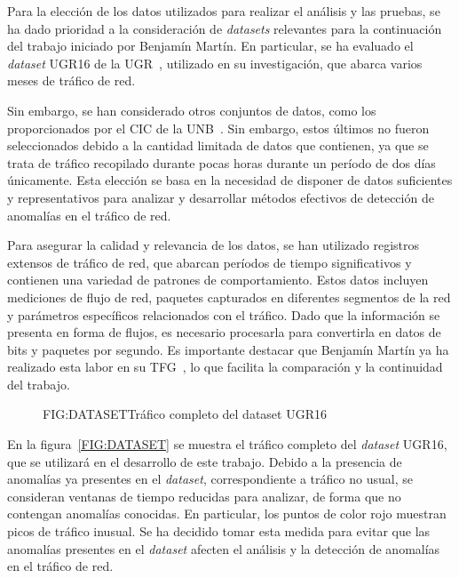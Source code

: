 Para la elección de los datos utilizados para realizar el análisis y las pruebas, se ha dado prioridad a la consideración de \textit{datasets} relevantes para la continuación del trabajo iniciado por Benjamín Martín. En particular, se ha evaluado el \textit{dataset} UGR16 de la  \ac{UGR}~\cite{datosugr16}, utilizado en su investigación, que abarca varios meses de tráfico de red. 

Sin embargo, se han considerado otros conjuntos de datos, como los proporcionados por el \ac{CIC} de la \ac{UNB}~\cite{datosunb19}. Sin embargo, estos últimos no fueron seleccionados debido a la cantidad limitada de datos que contienen, ya que se trata de tráfico recopilado durante pocas horas durante un período de dos días únicamente. Esta elección se basa en la necesidad de disponer de datos suficientes y representativos para analizar y desarrollar métodos efectivos de detección de anomalías en el tráfico de red.

Para asegurar la calidad y relevancia de los datos, se han utilizado registros extensos de tráfico de red, que abarcan períodos de tiempo significativos y contienen una variedad de patrones de comportamiento. Estos datos incluyen mediciones de flujo de red, paquetes capturados en diferentes segmentos de la red y parámetros específicos relacionados con el tráfico. Dado que la información se presenta en forma de flujos, es necesario procesarla para convertirla en datos de bits y paquetes por segundo.
Es importante destacar que Benjamín Martín ya ha realizado esta labor en su \ac{TFG}~\cite{benjamin2021}, lo que facilita la comparación y la continuidad del trabajo.

\begin{figure}[Tráfico completo del dataset UGR16~\cite{datosugr16}]{FIG:DATASET}{Tráfico completo del dataset UGR16~\cite{datosugr16}}
\end{figure}

En la figura~\ref{FIG:DATASET} se muestra el tráfico completo del \textit{dataset} UGR16, que se utilizará en el desarrollo de este trabajo. Debido a la presencia de anomalías ya presentes en el \textit{dataset}, correspondiente a tráfico no usual, se consideran ventanas de tiempo reducidas para analizar, de forma que no contengan anomalías conocidas. En particular, los puntos de color rojo muestran picos de tráfico inusual. Se ha decidido tomar esta medida para evitar que las anomalías presentes en el \textit{dataset} afecten el análisis y la detección de anomalías en el tráfico de red.

